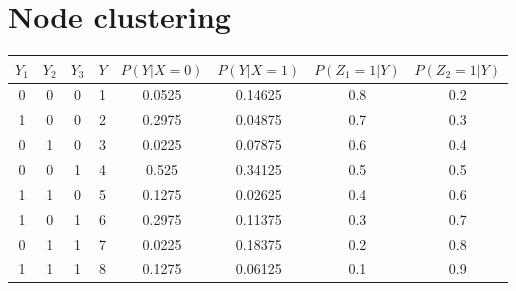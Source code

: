\documentclass[11]{article}
\begin{document}
\section{Node clustering}

\begin{table}[htp]
\centering
\begin{tabular}{|c|c|c|c|c|c|c|c|}
\hline
$Y_1$ & $Y_2$ & $Y_3$ & $Y$ & $P(Y|X=0)$ & $P(Y|X=1)$ & $P(Z_1=1|Y)$ & $P(Z_2=1|Y)$ \\ \hline
0     & 0     & 0     & 1   & 0.0525     & 0.14625    & 0.8          & 0.2          \\ \hline
1     & 0     & 0     & 2   & 0.2975     & 0.04875    & 0.7          & 0.3          \\ \hline
0     & 1     & 0     & 3   & 0.0225     & 0.07875    & 0.6          & 0.4          \\ \hline
0     & 0     & 1     & 4   & 0.525      & 0.34125    & 0.5          & 0.5          \\ \hline
1     & 1     & 0     & 5   & 0.1275     & 0.02625    & 0.4          & 0.6          \\ \hline
1     & 0     & 1     & 6   & 0.2975     & 0.11375    & 0.3          & 0.7          \\ \hline
0     & 1     & 1     & 7   & 0.0225     & 0.18375    & 0.2          & 0.8          \\ \hline
1     & 1     & 1     & 8   & 0.1275     & 0.06125    & 0.1          & 0.9          \\ \hline
\end{tabular}
\end{table}
\pagebreak
\end{document}
